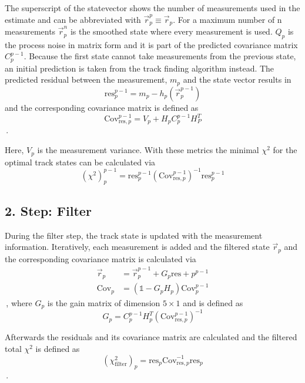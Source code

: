 The superscript of the statevector shows the number of measurements used in the estimate and can be abbreviated with $\vec{r}_p^p \equiv \vec{r}_p$. For a maximum number of n measurements $\vec{r}_p^n$ is the smoothed state where every measurement is used.
$Q_p$ is the process noise in matrix form and it is part of the predicted covariance matrix $C_p^{p-1}$.
Because the first state cannot take measurements from the previous state, an initial prediction is taken from the track finding algorithm instead.
The predicted residual between the measurement, $m_p$ and the state vector results in
\begin{equation}
  \text{res}_p^{p-1} = m_p - h_p\left( \vec{r}_p^{p-1} \right)
\end{equation}
and the corresponding covariance matrix is defined as
\begin{equation}
  \text{Cov}_{\text{res},p}^{p-1} = V_p + H_p C_p^{p-1} H_P^T
\end{equation}\,.

Here, $V_p$ is the measurement variance. With these metrics the minimal $\chi^2$ for the optimal track states can be calculated via
\begin{equation}
  \left( \chi^2 \right)_p^{p-1} = \text{res}_p^{p-1} \left(\text{Cov}_{\text{res},p}^{p-1}\right)^{-1} \text{res}_p^{p-1}
\end{equation}

\subsection{2. Step: Filter}
During the filter step, the track state is updated with the measurement information.
Iteratively, each measurement is added and the filtered state $\vec{r}_p$ and the corresponding covariance matrix is calculated via
\begin{align}
  \vec{r}_p &= \vec{r}_p^{p-1} + G_p \text{res}+p^{p-1} \\
  \text{Cov}_p &= \left(\mathbb{1} - G_p H_p\right) \text{Cov}_p^{p-1}
\end{align}\,,
where $G_p$ is the gain matrix of dimension $5\times1$ and is defined as
\begin{equation}
  G_p = C_p^{p-1} H_p^T \left( \text{Cov}_{\text{res},p}^{p-1} \right)^{-1}
\end{equation}

Afterwards the residuals and its covariance matrix are calculated and the filtered total $\chi^2$ is defined as
\begin{equation}
  \left( \chi^2_{\text{filter}} \right)_p = \text{res}_p \text{Cov}_{\text{res},p}^{-1} \text{res}_p
\end{equation}\,.

